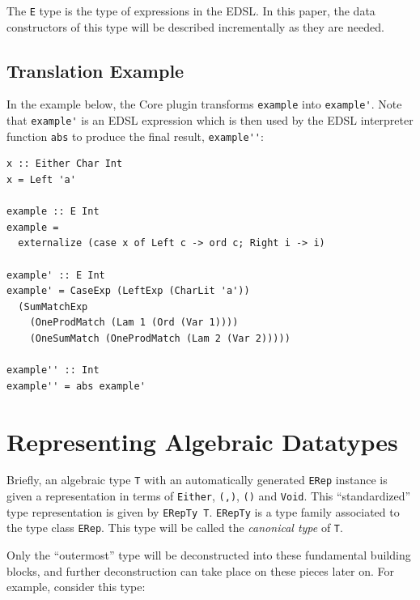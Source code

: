 \documentclass[runningheads, a4paper]{llncs}
\newcommand{\ttt}{\texttt}
\newenvironment{todo}
  {\ifthenelse{\isundefined{\showtodos}}{\comment}{\begin{tcolorbox}
    \textbf{TODO}:}}
  {\ifthenelse{\isundefined{\showtodos}}{\endcomment}{\end{tcolorbox}}
  }
\begin{document}
The \ttt{E} type is the type of expressions in the EDSL.  In this paper, the
data constructors of this type will be described incrementally as they
are needed.

\subsection{Translation Example}


In the example below, the Core plugin transforms \verb|example| into
\verb|example'|. Note that \verb|example'| is an EDSL expression which is then
used by the EDSL interpreter function \verb|abs| to produce the final result,
\verb|example''|:

\begin{lstlisting}[deletekeywords={Ord}]
x :: Either Char Int
x = Left 'a'

example :: E Int
example =
  externalize (case x of Left c -> ord c; Right i -> i)

example' :: E Int
example' = CaseExp (LeftExp (CharLit 'a'))
  (SumMatchExp
    (OneProdMatch (Lam 1 (Ord (Var 1))))
    (OneSumMatch (OneProdMatch (Lam 2 (Var 2)))))

example'' :: Int
example'' = abs example'
\end{lstlisting}

\section{Representing Algebraic Datatypes}
\label{sec:ADTRep}


Briefly, an algebraic type \ttt{T} with an automatically generated \ttt{ERep}
instance is given a representation in terms of \ttt{Either}, \ttt{(,)}, \ttt{()}
and \ttt{Void}.  This ``standardized'' type representation is given by \ttt{ERepTy
T}. \ttt{ERepTy} is a type family associated to the type class \ttt{ERep}. This
type will be called the \textit{canonical type} of \ttt{T}.

Only the ``outermost'' type will be deconstructed into these fundamental building
blocks, and further deconstruction can take place on these pieces later on. For
example, consider this type:
\end{document}
